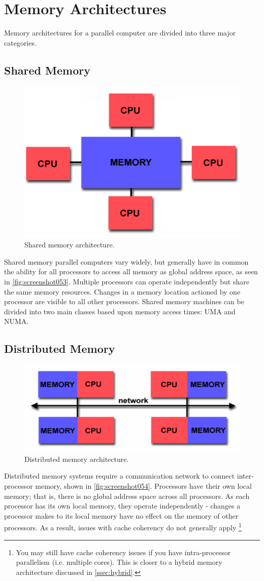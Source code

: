 \section{Memory Architectures}
Memory architectures for a parallel computer are divided into three major categories.

\subsection{Shared Memory}
\begin{figure}
\centering
\includegraphics[width=0.5\linewidth]{screenshot053}
\caption{Shared memory architecture.}
\label{fig:screenshot053}
\end{figure}

Shared memory parallel computers vary widely, but generally have in common the ability for all processors to access all memory as global address space, as seen in \autoref{fig:screenshot053}. Multiple processors can operate independently but share the same memory resources. Changes in a memory location actioned by one processor are visible to all other processors. Shared memory machines can be divided into two main classes based upon memory access times: UMA and NUMA. 

\subsection{Distributed Memory}
\begin{figure}
\centering
\includegraphics[width=0.5\linewidth]{screenshot054}
\caption{Distributed memory architecture.}
\label{fig:screenshot054}
\end{figure}

Distributed memory systems require a communication network to connect inter-processor memory, shown in \autoref{fig:screenshot054}. Processors have their own local memory; that is, there is no global address space across all processors. As each processor has its own local memory, they operate independently - changes a processor makes to its local memory have no effect on the memory of other processors. As a result, issues with cache coherency do not generally apply \footnote{You may still have cache coherency issues if you have intra-processor parallelism (i.e. multiple cores). This is closer to a hybrid memory architecture discussed in \autoref{ssec:hybrid}.}

